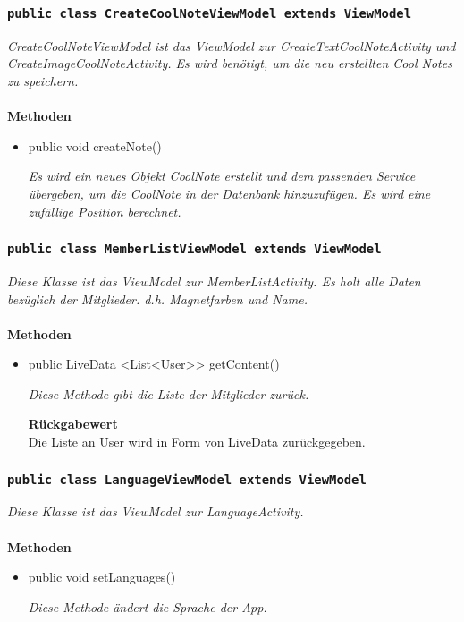            		\subsubsection{\texttt{public class CreateCoolNoteViewModel extends ViewModel}}
        \textit{CreateCoolNoteViewModel ist das ViewModel zur CreateTextCoolNoteActivity und CreateImageCoolNoteActivity. Es wird benötigt, um die neu erstellten Cool Notes zu speichern.}\\
        \\
		\textbf{Methoden} \\
 			\begin{itemize}
        		\item{public void createNote()}
        	
        		\textit{Es wird ein neues Objekt CoolNote erstellt und dem passenden Service übergeben, um die CoolNote in der Datenbank hinzuzufügen. Es wird eine zufällige Position berechnet. }
        	
       		 \end{itemize}
       		 
           		\subsubsection{\texttt{public class MemberListViewModel extends ViewModel}}
        \textit{Diese Klasse ist das ViewModel zur MemberListActivity. Es holt alle Daten bezüglich der Mitglieder. d.h. Magnetfarben und Name.}\\
        \\
		\textbf{Methoden} \\
 			\begin{itemize}
        		\item{public LiveData <List<User>> getContent()}
        	
        		\textit{Diese Methode gibt die Liste der Mitglieder zurück.}
        	
        	\textbf{Rückgabewert} \\
				Die Liste an User wird in Form von LiveData zurückgegeben.
				
       		 \end{itemize}
       		 
       		   \subsubsection{\texttt{public class LanguageViewModel extends ViewModel}}
        \textit{Diese Klasse ist das ViewModel zur LanguageActivity.}\\
        \\
		\textbf{Methoden} \\
 			\begin{itemize}
        		\item{public void setLanguages()}
        	
        		\textit{Diese Methode ändert die Sprache der App.}
        	
       		 \end{itemize}
       		 
